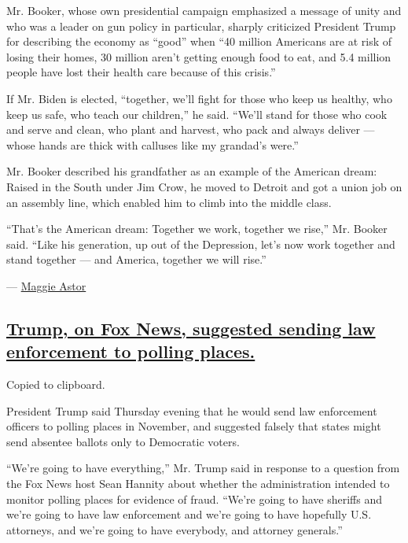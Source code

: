 Mr. Booker, whose own presidential campaign emphasized a message of
unity and who was a leader on gun policy in particular, sharply
criticized President Trump for describing the economy as ``good'' when
``40 million Americans are at risk of losing their homes, 30 million
aren't getting enough food to eat, and 5.4 million people have lost
their health care because of this crisis.''

If Mr. Biden is elected, ``together, we'll fight for those who keep us
healthy, who keep us safe, who teach our children,'' he said. ``We'll
stand for those who cook and serve and clean, who plant and harvest, who
pack and always deliver --- whose hands are thick with calluses like my
grandad's were.''

Mr. Booker described his grandfather as an example of the American
dream: Raised in the South under Jim Crow, he moved to Detroit and got a
union job on an assembly line, which enabled him to climb into the
middle class.

``That's the American dream: Together we work, together we rise,'' Mr.
Booker said. ``Like his generation, up out of the Depression, let's now
work together and stand together --- and America, together we will
rise.''

--- \href{https://www.nytimes3xbfgragh.onion/by/maggie-astor}{Maggie
Astor}

\hypertarget{trump-on-fox-news-suggested-sending-law-enforcement-to-polling-places}{%
\subsection{\texorpdfstring{\protect\hyperlink{trump-on-fox-news-suggested-sending-law-enforcement-to-polling-places}{Trump,
on Fox News, suggested sending law enforcement to polling
places.}}{Trump, on Fox News, suggested sending law enforcement to polling places.}}\label{trump-on-fox-news-suggested-sending-law-enforcement-to-polling-places}}

Copied to clipboard.

President Trump said Thursday evening that he would send law enforcement
officers to polling places in November, and suggested falsely that
states might send absentee ballots only to Democratic voters.

``We're going to have everything,'' Mr. Trump said in response to a
question from the Fox News host Sean Hannity about whether the
administration intended to monitor polling places for evidence of fraud.
``We're going to have sheriffs and we're going to have law enforcement
and we're going to have hopefully U.S. attorneys, and we're going to
have everybody, and attorney generals.''

